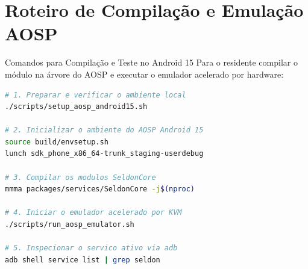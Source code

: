 \section{Roteiro de Compilação e Emulação AOSP}

\begin{casopratico}{Comandos para Compilação e Teste no Android 15}
Para o residente compilar o módulo na árvore do AOSP e executar o emulador acelerado por hardware:
\begin{lstlisting}[language=bash]
# 1. Preparar e verificar o ambiente local
./scripts/setup_aosp_android15.sh

# 2. Inicializar o ambiente do AOSP Android 15
source build/envsetup.sh
lunch sdk_phone_x86_64-trunk_staging-userdebug

# 3. Compilar os modulos SeldonCore
mmma packages/services/SeldonCore -j$(nproc)

# 4. Iniciar o emulador acelerado por KVM
./scripts/run_aosp_emulator.sh

# 5. Inspecionar o servico ativo via adb
adb shell service list | grep seldon
\end{lstlisting}
\end{casopratico}
